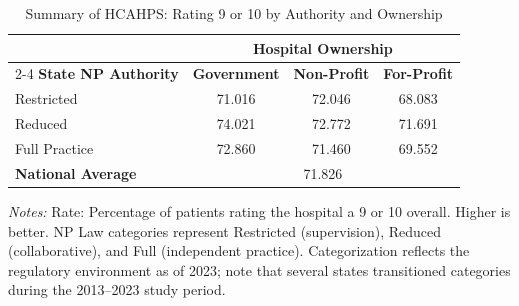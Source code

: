 \begin{table}[htbp]
    \centering
    \caption{Summary of HCAHPS: Rating 9 or 10 by Authority and Ownership}
    \label{tab:h_hosp_rating_9_10}
    \vspace{0.2cm}
    \begin{tabular}{lccc}
        \toprule
        & \multicolumn{3}{c}{\textbf{Hospital Ownership}} \\
        \cmidrule(lr){2-4}
        \textbf{State NP Authority} & \textbf{Government} & \textbf{Non-Profit} & \textbf{For-Profit} \\
        \midrule
        Restricted & 71.016 & 72.046 & 68.083 \\
        Reduced & 74.021 & 72.772 & 71.691 \\
        Full Practice & 72.860 & 71.460 & 69.552 \\
        \midrule
        \textbf{National Average} & \multicolumn{3}{c}{71.826} \\
        \bottomrule
    \end{tabular}
    \vspace{0.1cm}
    \begin{minipage}{0.85\textwidth}
        \footnotesize \textit{Notes:} Rate: Percentage of patients rating the hospital a 9 or 10 overall. Higher is better. NP Law categories represent Restricted (supervision), Reduced (collaborative), and Full (independent practice). Categorization reflects the regulatory environment as of 2023; note that several states transitioned categories during the 2013--2023 study period.
    \end{minipage}
\end{table}